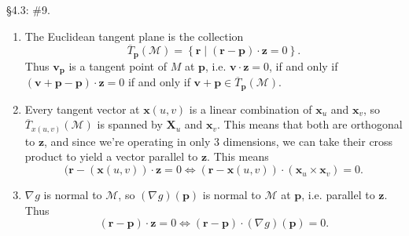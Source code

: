 \documentclass[10pt]{report}
\begin{document}
\begin{exer}[]
\S 4.3: \#9.
\end{exer}
\begin{enumerate}
	\item The Euclidean tangent plane is the collection
		\[
			\overline{T}_{\mathbf{p}}(\mathcal{M}) = \left\{ \mathbf{r} \;|\; (\mathbf{r}-\mathbf{p})\cdot \mathbf{z}=0 \right\}.
		\] Thus $\mathbf{v}_{\mathbf{p}}$ is a tangent point of $M$ at $\mathbf{p}$, i.e. $\mathbf{v} \cdot \mathbf{z} = 0$, if and only if $(\mathbf{v} + \mathbf{p}-\mathbf{p}) \cdot \mathbf{z}=0$ if and only if $\mathbf{v} + \mathbf{p} \in \overline{T}_{\mathbf{p}}(\mathcal{M})$.

	\item Every tangent vector at $\mathbf{x}(u,v)$ is a linear combination of $\mathbf{x}_{u}$ and $\mathbf{x}_{v}$, so $\overline{T}_{x(u,v)}(\mathcal{M})$ is spanned by $\mathbf{X}_{u}$ and $\mathbf{x}_{v}$. This means that both are orthogonal to $\mathbf{z}$, and since we're operating in only 3 dimensions, we can take their cross product to yield a vector parallel to $\mathbf{z}$. This means
		\[
			(\mathbf{r}-(\mathbf{x}(u,v)) \cdot \mathbf{z}=0 \iff (\mathbf{r}-\mathbf{x}(u,v))\cdot (\mathbf{x}_{u}\times \mathbf{x}_{v}) = 0.
		\] 

	\item $\nabla_{}g$ is normal to $\mathcal{M}$, so $(\nabla_{}g)(\mathbf{p})$ is normal to $\mathcal{M}$ at $\mathbf{p}$, i.e. parallel to $\mathbf{z}$. Thus
		\[
			( \mathbf{r}-\mathbf{p})\cdot \mathbf{z} = 0 \iff (\mathbf{r}-\mathbf{p}) \cdot (\nabla_{}g)(\mathbf{p}) = 0.
		\] 
\end{enumerate}
\end{document}
